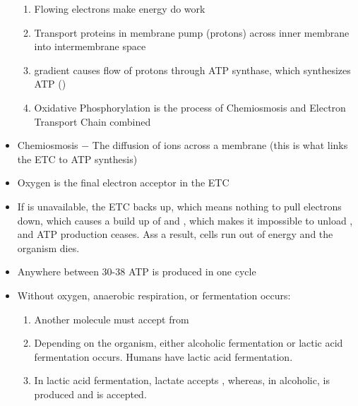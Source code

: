 \documentclass[12pt]{article}
\begin{document}
\begin{itemize}
\begin{enumerate}
    \item Flowing electrons make energy do work

    \item Transport proteins in membrane pump  (protons) across inner membrane into intermembrane space

    \item {} gradient causes flow of protons through ATP synthase, which synthesizes ATP ()

    \item Oxidative Phosphorylation is the process of Chemiosmosis and Electron Transport Chain combined

  \end{enumerate}

    \item Chemiosmosis $-$ The diffusion of ions across a membrane (this is what links the ETC to ATP synthesis)

    \item Oxygen is the final electron acceptor in the ETC

    \item If  is unavailable, the ETC backs up, which means nothing to pull electrons down, which causes a build up of  and , which makes it impossible to unload , and ATP production ceases. Ass a result, cells run out of energy and the organism dies.

    \item Anywhere between 30-38 ATP is produced in one cycle
      
    \item Without oxygen, anaerobic respiration, or fermentation occurs:

      \begin{enumerate}

        \item Another molecule must accept  from 

        \item Depending on the organism, either alcoholic fermentation or lactic acid fermentation occurs. Humans have lactic acid fermentation.
        
        \item In lactic acid fermentation, lactate accepts , whereas, in alcoholic,  is produced and  is accepted.

      \end{enumerate}

\end{itemize}
\end{document}
